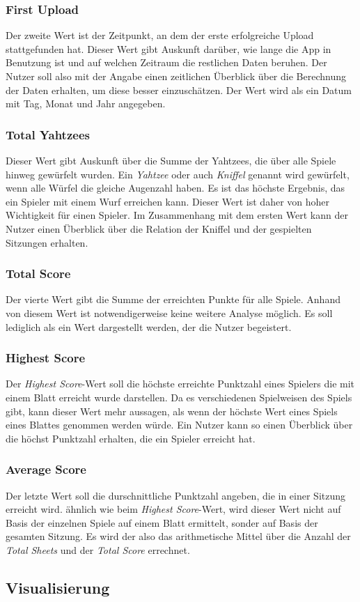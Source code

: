 \subsubsection{First Upload}
Der zweite Wert ist der Zeitpunkt, an dem der erste erfolgreiche Upload stattgefunden hat. Dieser Wert gibt Auskunft darüber, wie lange die App in Benutzung ist und auf welchen Zeitraum die restlichen Daten beruhen. Der Nutzer soll also mit der Angabe einen zeitlichen Überblick über die Berechnung der Daten erhalten, um diese besser einzuschätzen. Der Wert wird als ein Datum mit Tag, Monat und Jahr angegeben.

\subsubsection{Total Yahtzees}
Dieser Wert gibt Auskunft über die Summe der Yahtzees, die über alle Spiele hinweg gewürfelt wurden. Ein \textit{Yahtzee} oder auch \textit{Kniffel} genannt wird gewürfelt, wenn alle Würfel die gleiche Augenzahl haben. Es ist das höchste Ergebnis, das ein Spieler mit einem Wurf erreichen kann. Dieser Wert ist daher von hoher Wichtigkeit für einen Spieler. Im Zusammenhang mit dem ersten Wert kann der Nutzer einen Überblick über die Relation der Kniffel und der gespielten Sitzungen erhalten.

\subsubsection{Total Score}
Der vierte Wert gibt die Summe der erreichten Punkte für alle Spiele. Anhand von diesem Wert ist notwendigerweise keine weitere Analyse möglich. Es soll lediglich als ein Wert dargestellt werden, der die Nutzer begeistert.

\subsubsection{Highest Score}
Der \textit{Highest Score}-Wert soll die höchste erreichte Punktzahl eines Spielers die mit einem Blatt erreicht wurde darstellen. Da es verschiedenen Spielweisen des Spiels gibt, kann dieser Wert mehr aussagen, als wenn der höchste Wert eines Spiels eines Blattes genommen werden würde. Ein Nutzer kann so einen Überblick über die höchst Punktzahl erhalten, die ein Spieler erreicht hat.

\subsubsection{Average Score}
Der letzte Wert soll die durschnittliche Punktzahl angeben, die in einer Sitzung erreicht wird. ähnlich wie beim \textit{Highest Score}-Wert, wird dieser Wert nicht auf Basis der einzelnen Spiele auf einem Blatt ermittelt, sonder auf Basis der gesamten Sitzung. Es wird der also das arithmetische Mittel über die Anzahl der \textit{Total Sheets} und der \textit{Total Score} errechnet.

\subsection{Visualisierung}